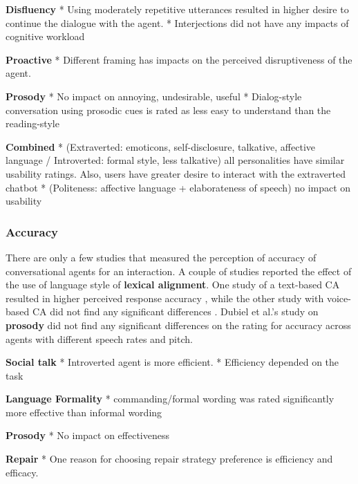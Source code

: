 \documentclass[sigconf,screen,review, anonymous]{acmart}
\newcommand{\cmt}[1]{}%
\begin{document}
\textbf{Disfluency}
* Using moderately repetitive utterances resulted in higher desire to continue the dialogue with the agent. \cite{yang2021effect}\cmt{[72]}
* Interjections did not have any impacts of cognitive workload \cite{ceha2022expressive}\cmt{[77]}

\textbf{Proactive}
* Different framing has impacts on the perceived disruptiveness of the agent. \cite{xiao2021let}\cmt{[73]}

\textbf{Prosody}
* No impact on annoying, undesirable, useful \cite{jestin2022effects}\cmt{[81]}
* Dialog-style conversation using prosodic cues is rated as less easy to understand than the reading-style \cite{misu2011toward}\cmt{[83]}

\textbf{Combined}
* (Extraverted: emoticons, self-disclosure, talkative, affective language / Introverted: formal style, less talkative) all personalities have similar usability ratings. Also, users have greater desire to interact with the extraverted chatbot \cite{volkel2022user}\cmt{[75]}
* (Politeness: affective language + elaborateness of speech) no impact on usability \cite{hu2022polite}\cmt{[76]}


\subsubsection{Accuracy}
There are only a few studies that measured the perception of accuracy of conversational agents for an interaction. A couple of studies reported the effect of the use of language style of \textbf{lexical alignment}. One study of a text-based CA resulted in higher perceived response accuracy \cite{huiyang2022improving}\cmt{[17]}, while the other study with voice-based CA did not find any significant differences \cite{linnemann2018can}\cmt{[15]}. Dubiel et al.'s study \cite{dubiel2020persuasive}\cmt{[60]} on \textbf{prosody} did not find any significant differences on the rating for accuracy across agents with different speech rates and pitch.

\textbf{Social talk}
* Introverted agent is more efficient. \cite{roy2021users}\cmt{[71]}
* Efficiency depended on the task \cite{haas2022keep}\cmt{[78]}

\textbf{Language Formality}
* commanding/formal wording was rated significantly more effective than informal wording \cite{jestin2022effects}\cmt{[81]}

\textbf{Prosody}
* No impact on effectiveness \cite{jestin2022effects}\cmt{[81]}

\textbf{Repair}
* One reason for choosing repair strategy preference is efficiency and efficacy. \cite{ashktorab2019resilient}\cmt{[88]}
\end{document}
